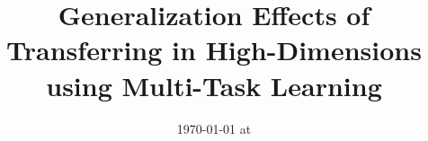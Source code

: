 \documentclass{article}
\begin{document}
\title{Generalization Effects of Transferring in High-Dimensions using Multi-Task Learning}
\date{}
\maketitle
\date{{\ddmmyyyydate\today} at \currenttime}











\newpage
\appendix



\end{document}
